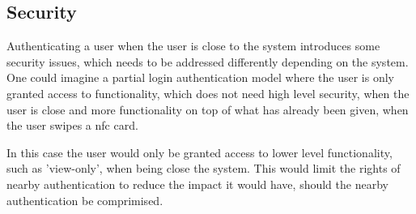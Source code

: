 \subsection{Security}

Authenticating a user when the user is close to the system introduces some security issues, which needs to be addressed differently depending on the system. One could imagine a partial login authentication model where the user is only granted access to functionality, which does not need high level security, when the user is close and more functionality on top of what has already been given, when the user swipes a nfc card. 

In this case the user would only be granted access to lower level functionality, such as 'view-only', when being close the system. This would limit the rights of nearby authentication to reduce the impact it would have, should the nearby authentication be comprimised. 

